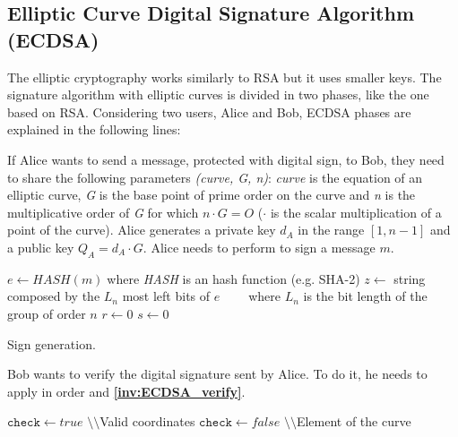 \subsection{Elliptic Curve Digital Signature Algorithm (ECDSA)}
The elliptic cryptography works similarly to RSA but it uses smaller keys. The signature algorithm with elliptic curves is divided in two phases, like the one based on RSA. Considering two users, Alice and Bob, ECDSA phases are explained in the following lines:
\begin{itemize}
{If Alice wants to send a message, protected with digital sign, to Bob, they need to share the following parameters \textit{(curve, G, n)}: \textit{curve} is the equation of an elliptic curve, \textit{G} is the base point of prime order on the curve and \textit{n} is the multiplicative order of \textit{G} for which $n\cdot G = O$ ($\cdot$ is the scalar multiplication of a point of the curve).
Alice generates a private key $d_A$ in the range $[1, n-1]$ and a public key $Q_A=d_A\cdot G$. Alice needs to perform  to sign a message $m$.
\begin{algorithm}[h]
\DontPrintSemicolon\footnotesize
{}
\BlankLine
$e\gets HASH(m)\;$where \textit{HASH} is an hash function (e.g. SHA-2)\;
\BlankLine
$z \gets$ string composed by the $L_n$ most left bits of $e$\;
$\;\;\;\;\;\;\;$where $L_n$ is the bit length of the group of order $n$\;
$r\gets 0$\;
$s\gets 0$\;
\BlankLine
{}
\caption{Sign generation.}\label{inv:ECDSA_sign}
\end{algorithm}
}
{Bob wants to verify the digital signature sent by Alice. To do it, he needs to apply in order  and \textbf{\ref{inv:ECDSA_verify}}.\\
\begin{algorithm}[h]
\DontPrintSemicolon\footnotesize
{}
\BlankLine
$\mathtt{check}\gets true$\;
\BlankLine
$\setminus\setminus$Valid coordinates\;
{	
$\mathtt{check}\gets false$\;
}
\BlankLine
$\setminus\setminus$Element of the curve\;

\end{algorithm}}
\end{itemize}
